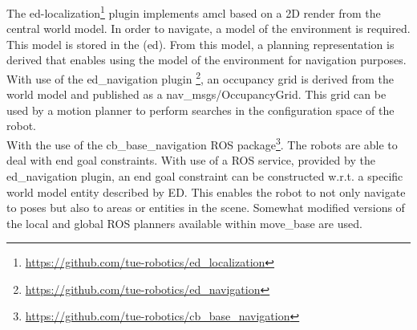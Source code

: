 The \acrshort{ed}-localization\footnote{\url{https://github.com/tue-robotics/ed_localization}} plugin implements \acrshort{amcl} based on a 2D render from the central world model. In order to navigate, a model of the environment is required. This model is stored in the (\acrshort{ed}). From this model, a planning representation is derived that enables using the model of the environment for navigation purposes.
\\
With use of the ed\_navigation plugin \footnote{\url{https://github.com/tue-robotics/ed_navigation}}, an occupancy grid is derived from the world model and published as a nav\_msgs/OccupancyGrid. This grid can be used by a motion planner to perform searches in the configuration space of the robot.
\\
With the use of the cb\_base\_navigation ROS package\footnote{\url{https://github.com/tue-robotics/cb_base_navigation}}. The robots are able to deal with end goal constraints. With use of a ROS service, provided by the ed\_navigation plugin, an end goal constraint can be constructed w.r.t. a specific world model entity described by ED. This enables the robot to not only navigate to poses but also to areas or entities in the scene. 
Somewhat modified versions of the local and global ROS planners available within move\_base are used. 
